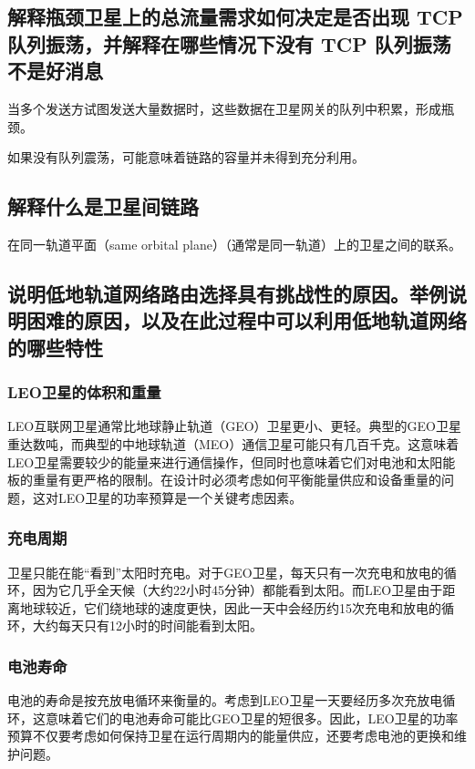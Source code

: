 \subsection{解释瓶颈卫星上的总流量需求如何决定是否出现 TCP 队列振荡，并解释在哪些情况下没有 TCP 队列振荡不是好消息}

当多个发送方试图发送大量数据时，这些数据在卫星网关的队列中积累，形成瓶颈。

如果没有队列震荡，可能意味着链路的容量并未得到充分利用。

\subsection{解释什么是卫星间链路}

在同一轨道平面（same orbital plane）（通常是同一轨道）上的卫星之间的联系。

\subsection{说明低地轨道网络路由选择具有挑战性的原因。举例说明困难的原因，以及在此过程中可以利用低地轨道网络的哪些特性}

\subsubsection{LEO卫星的体积和重量}

LEO互联网卫星通常比地球静止轨道（GEO）卫星更小、更轻。典型的GEO卫星重达数吨，而典型的中地球轨道（MEO）通信卫星可能只有几百千克。这意味着LEO卫星需要较少的能量来进行通信操作，但同时也意味着它们对电池和太阳能板的重量有更严格的限制。在设计时必须考虑如何平衡能量供应和设备重量的问题，这对LEO卫星的功率预算是一个关键考虑因素。

\subsubsection{充电周期}

卫星只能在能“看到”太阳时充电。对于GEO卫星，每天只有一次充电和放电的循环，因为它几乎全天候（大约22小时45分钟）都能看到太阳。而LEO卫星由于距离地球较近，它们绕地球的速度更快，因此一天中会经历约15次充电和放电的循环，大约每天只有12小时的时间能看到太阳。

\subsubsection{电池寿命}

电池的寿命是按充放电循环来衡量的。考虑到LEO卫星一天要经历多次充放电循环，这意味着它们的电池寿命可能比GEO卫星的短很多。因此，LEO卫星的功率预算不仅要考虑如何保持卫星在运行周期内的能量供应，还要考虑电池的更换和维护问题。



